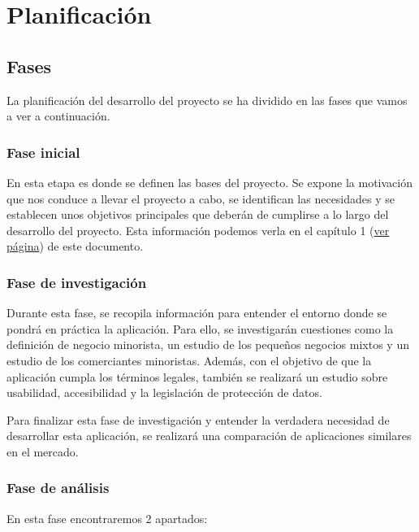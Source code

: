 \chapter{Planificación}
\label{chap:planification}


\section{Fases}

La planificación del desarrollo del proyecto se ha dividido en las fases que vamos a ver a continuación.

\subsection{Fase inicial}

En esta etapa es donde se definen las bases del proyecto. Se expone la motivación que nos conduce a llevar el proyecto a cabo, se identifican las necesidades y se establecen unos objetivos principales que deberán de cumplirse a lo largo del desarrollo del proyecto. Esta información podemos verla en el capítulo 1 (\hyperref[chap:introduction]{ver página}) de este documento. 

\subsection{Fase de investigación}

Durante esta fase, se recopila información para entender el entorno donde se pondrá en práctica la aplicación. Para ello, se investigarán cuestiones como la definición de negocio minorista, un estudio de los pequeños negocios mixtos y un estudio de los comerciantes minoristas. Además, con el objetivo de que la aplicación cumpla los términos legales, también se realizará un estudio sobre usabilidad, accesibilidad y la legislación de protección de datos. 

Para finalizar esta fase de investigación y entender la verdadera necesidad de desarrollar esta aplicación, se realizará una comparación de aplicaciones similares en el mercado. 

\subsection{Fase de análisis}

En esta fase encontraremos 2 apartados: 


